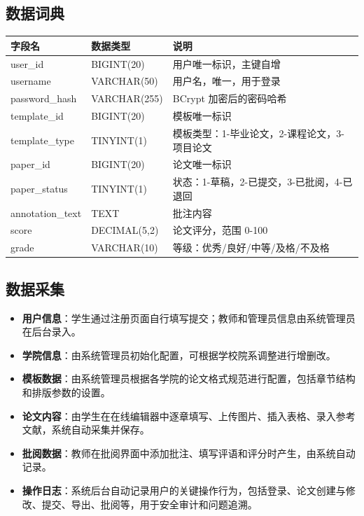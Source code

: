 \documentclass{softeng}
\begin{document}
\subsection{数据词典}	
	\begin{tabular}{|p{3cm}|p{2.5cm}|p{5.5cm}|}
		\hline
		\textbf{字段名} & \textbf{数据类型} & \textbf{说明} \\
		\hline
		user\_id & BIGINT(20) & 用户唯一标识，主键自增 \\
		\hline
		username & VARCHAR(50) & 用户名，唯一，用于登录 \\
		\hline
		password\_hash & VARCHAR(255) & BCrypt 加密后的密码哈希 \\
		\hline
		template\_id & BIGINT(20) & 模板唯一标识 \\
		\hline
		template\_type & TINYINT(1) & 模板类型：1-毕业论文，2-课程论文，3-项目论文 \\
		\hline
		paper\_id & BIGINT(20) & 论文唯一标识 \\
		\hline
		paper\_status & TINYINT(1) & 状态：1-草稿，2-已提交，3-已批阅，4-已退回 \\
		\hline
		annotation\_text & TEXT & 批注内容 \\
		\hline
		score & DECIMAL(5,2) & 论文评分，范围 0-100 \\
		\hline
		grade & VARCHAR(10) & 等级：优秀/良好/中等/及格/不及格 \\
		\hline
	\end{tabular}
	
\subsection{数据采集}
    \begin{itemize}
       \item \textbf{用户信息}：学生通过注册页面自行填写提交；教师和管理员信息由系统管理员在后台录入。
       \item \textbf{学院信息}：由系统管理员初始化配置，可根据学校院系调整进行增删改。
       \item \textbf{模板数据}：由系统管理员根据各学院的论文格式规范进行配置，包括章节结构和排版参数的设置。
       \item \textbf{论文内容}：由学生在在线编辑器中逐章填写、上传图片、插入表格、录入参考文献，系统自动采集并保存。
       \item \textbf{批阅数据}：教师在批阅界面中添加批注、填写评语和评分时产生，由系统自动记录。
       \item \textbf{操作日志}：系统后台自动记录用户的关键操作行为，包括登录、论文创建与修改、提交、导出、批阅等，用于安全审计和问题追溯。
    \end{itemize}
\end{document}
